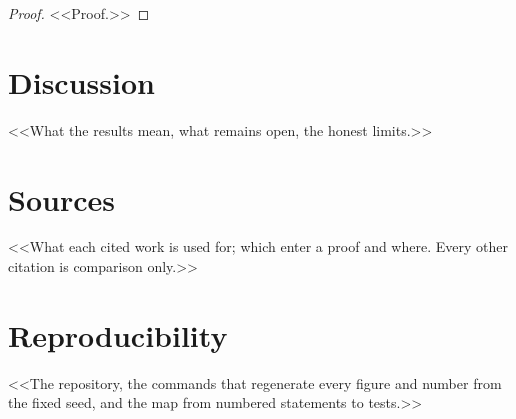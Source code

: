 \documentclass[a4paper,11pt]{article}
\begin{document}
\begin{proof}
<<Proof.>>
\end{proof}

\section{Discussion}\label{sec:discussion}

<<What the results mean, what remains open, the honest limits.>>

\appendix

\section{Sources}\label{app:sources}

<<What each cited work is used for; which enter a proof and where. Every other citation is comparison only.>>

\section{Reproducibility}\label{app:code}

<<The repository, the commands that regenerate every figure and number from the fixed seed, and the map from numbered statements to tests.>>



\end{document}
